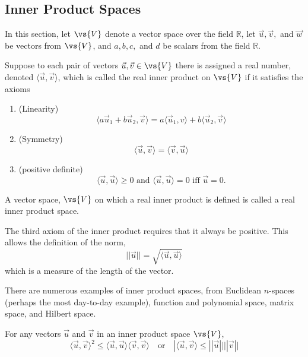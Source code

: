 \subsection{Inner Product Spaces}
\label{sec:innerproduct}
In this section, let $\vs{V}$ denote a vector space over the field
$\mathbb{R}$, let $\vec{u}, \vec{v},$ and $\vec{w}$ be vectors from
$\vs{V}$, and $a, b, c,$ and $d$ be scalars from the field
$\mathbb{R}$.
\begin{definition}
  Suppose to each pair of vectors $\vec{u},\vec{v} \in \vs{V}$ there
  is assigned a real number, denoted $\langle \vec{u}, \vec{v}
  \rangle$, which is called the real inner product on $\vs{V}$ if it
  satisfies the axioms
  \begin{enumerate}
  \item (Linearity)
    \[ \langle a \vec{u}_1 + b \vec{u}_2 , \vec{v} \rangle = a \langle
    \vec{u}_1, v \rangle + b \langle \vec{u}_2, \vec{v} \rangle \]
  \item (Symmetry)
    \[ \langle \vec{u}, \vec{v} \rangle = \langle \vec{v}, \vec{u}
    \rangle \]
  \item (positive definite)
    \[ \langle \vec{u}, \vec{u} \rangle \geq 0 \text{ and }
       \langle \vec{u}, \vec{u} \rangle = 0 \text{ iff } \vec{u} = 0. 
    \]
  \end{enumerate}
\end{definition}
\begin{definition}
  A vector space, $\vs{V}$ on which a real inner product is defined is
  called a real inner product space.
\end{definition}
\begin{definition}
  The third axiom of the inner product requires that it always be
  positive. This allows the definition of the norm,
  \[ ||\vec{u}|| = \sqrt{ \langle \vec{u}, \vec{u} \rangle } \] which
  is a measure of the length of the vector.
\end{definition}
There are numerous examples of inner product spaces, from Euclidean $n$-spaces (perhaps the most day-to-day example), function and polynomial space, matrix space, and Hilbert space.
\begin{theorem}
  For any vectors $\vec{u}$ and $\vec{v}$ in an inner product space $\vs{V}$, 
  \[ \langle \vec{u}, \vec{v} \rangle^2 \leq \langle \vec{u}, \vec{u}
  \rangle \langle \vec{v}, \vec{v} \rangle \quad \text{or} \quad |
  \langle \vec{u}, \vec{v} \rangle \leq ||\vec{u}|| ||\vec{v}|| \]
\end{theorem}
